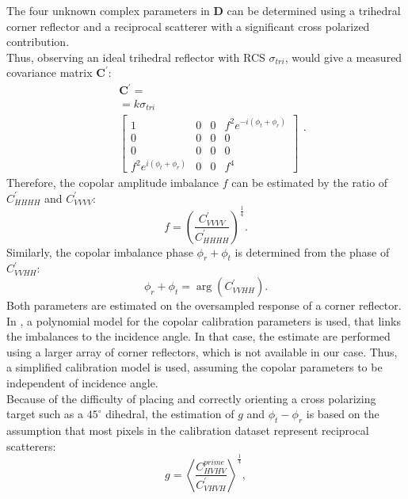 The four unknown complex parameters in $\mathbf{D}$ can be determined using a trihedral corner reflector and a reciprocal scatterer with a significant cross polarized contribution\cite{Sarabandi1989,Pipia2009}.\\
Thus, observing an ideal trihedral reflector with RCS $\sigma_{tri}$, would give 
a measured covariance matrix $\mathbf{C^{\prime}}$:
\begin{equation}
	\begin{aligned}
	&\mathbf{C^{\prime}} =\\
	&= k \sigma_{tri}\\
	&\begin{bmatrix}
		1 & 0 & 0 & f^2 e^{-i \left(\phi_t + \phi_r\right)}\\
		0 & 0 & 0 & 0\\
		0 & 0 & 0 & 0\\
		f^2 e^{i \left(\phi_t + \phi_r\right)} & 0 & 0 & f^4
	\end{bmatrix}
	\end{aligned}.
\end{equation}
Therefore, the  copolar amplitude imbalance $f$ can be estimated by the ratio of $C_{HHHH}^\prime$ and $C_{VVVV}^\prime$:
\begin{equation}
	f = \left(\frac{C^{\prime}_{VVVV}}{C^{\prime}_{HHHH}}\right)^{\frac{1}{4}}.
\end{equation}
Similarly, the copolar imbalance phase $\phi_r + \phi_t$ is determined from the phase of $C_{VVHH}^{\prime}$:
\begin{equation}
	\phi_r + \phi_t = \operatorname{arg}\left(C_{VVHH}^\prime\right).
\end{equation}
Both parameters are estimated on the oversampled response of a corner reflector. In \cite{Fore2015}, a polynomial model for the copolar calibration parameters is used, that links the imbalances to the incidence angle. In that case, the estimate are performed using a larger array of corner reflectors, which is not available in our case. Thus, a simplified calibration model is used, assuming the copolar parameters to be independent of incidence angle.\\ 
Because of the difficulty of placing and correctly orienting a cross polarizing target such as a $45^\circ$ dihedral, the estimation of $g$ and $\phi_t - \phi_r$ is based on the assumption that most pixels in the calibration dataset represent reciprocal scatterers:
\begin{equation}
	g = \left<\frac{C_{HVHV}^{prime}}{C_{VHVH}^{\prime}}\right>^\frac{1}{4},
\end{equation}
